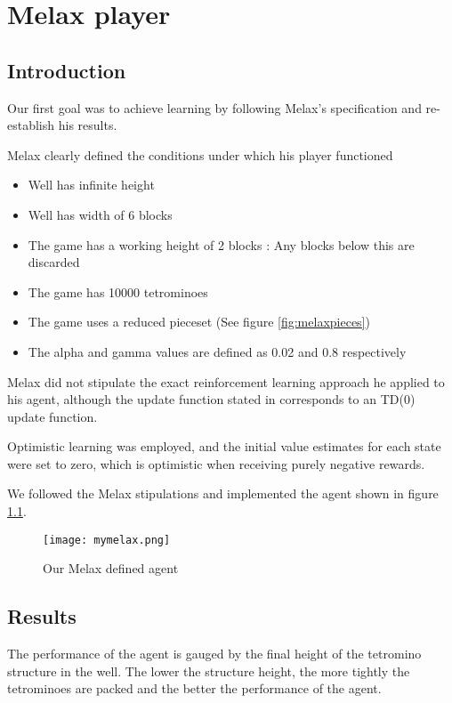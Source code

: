 \documentclass{rucsthesis}
\begin{document}
\chapter{Melax player}

\section{Introduction}

Our first goal was to achieve learning by following Melax's specification and re-establish his results.

Melax clearly defined the conditions under which his player functioned

\begin{itemize}
\item{Well has infinite height}
\item{Well has width of 6 blocks}
\item{The game has a working height of 2 blocks : Any blocks below this are discarded}
\item{The game has 10000 tetrominoes}
\item{The game uses a reduced pieceset (See figure \ref{fig:melaxpieces})}
\item{The alpha and gamma values are defined as 0.02 and 0.8 respectively}
\end{itemize}

Melax did not stipulate the exact reinforcement learning approach he applied to his agent, although the update function stated in \cite{melaxtetris} corresponds to an TD(0) update function.

Optimistic learning was employed, and the initial value estimates for each state were set to zero, which is optimistic when receiving purely negative rewards. 

We followed the Melax stipulations and implemented the agent shown in figure \ref{fig:mymelax}.

\begin{figure}[h]
\centering
\texttt{[image: mymelax.png]}
\caption{Our Melax defined agent}
\label{fig:mymelax}
\end{figure}

\section{Results}

The performance of the agent is gauged by the final height of the tetromino structure in the well. The lower the structure height, the more tightly the tetrominoes are packed and the better the performance of the agent.
\end{document}
